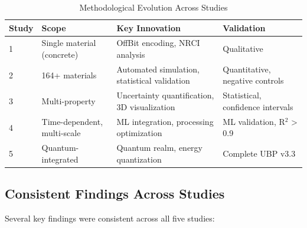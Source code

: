 \documentclass[11pt,a4paper]{article}
\begin{document}
\begin{table}[H]
\centering
\caption{Methodological Evolution Across Studies}
\begin{tabular}{lp{3cm}p{3cm}p{3cm}}
\toprule
\textbf{Study} & \textbf{Scope} & \textbf{Key Innovation} & \textbf{Validation} \\
\midrule
1 & Single material (concrete) & OffBit encoding, NRCI analysis & Qualitative \\
2 & 164+ materials & Automated simulation, statistical validation & Quantitative, negative controls \\
3 & Multi-property & Uncertainty quantification, 3D visualization & Statistical, confidence intervals \\
4 & Time-dependent, multi-scale & ML integration, processing optimization & ML validation, R$^2$ > 0.9 \\
5 & Quantum-integrated & Quantum realm, energy quantization & Complete UBP v3.3 \\
\bottomrule
\end{tabular}
\end{table}

\subsection{Consistent Findings Across Studies}

Several key findings were consistent across all five studies:
\end{document}
